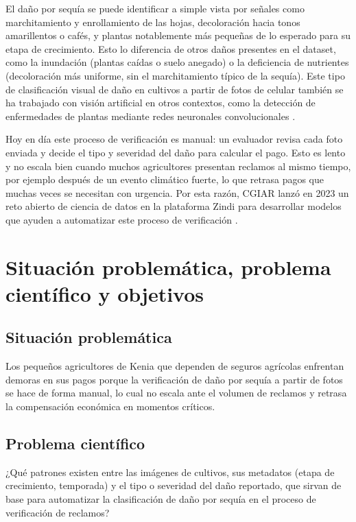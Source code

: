 \documentclass[11pt]{article}
\begin{document}
El daño por sequía se puede identificar a simple vista por señales como marchitamiento y enrollamiento de las hojas, decoloración hacia tonos amarillentos o cafés, y plantas notablemente más pequeñas de lo esperado para su etapa de crecimiento. Esto lo diferencia de otros daños presentes en el dataset, como la inundación (plantas caídas o suelo anegado) o la deficiencia de nutrientes (decoloración más uniforme, sin el marchitamiento típico de la sequía). Este tipo de clasificación visual de daño en cultivos a partir de fotos de celular también se ha trabajado con visión artificial en otros contextos, como la detección de enfermedades de plantas mediante redes neuronales convolucionales \cite{mohanty2016}.

Hoy en día este proceso de verificación es manual: un evaluador revisa cada foto enviada y decide el tipo y severidad del daño para calcular el pago. Esto es lento y no escala bien cuando muchos agricultores presentan reclamos al mismo tiempo, por ejemplo después de un evento climático fuerte, lo que retrasa pagos que muchas veces se necesitan con urgencia. Por esta razón, CGIAR lanzó en 2023 un reto abierto de ciencia de datos en la plataforma Zindi para desarrollar modelos que ayuden a automatizar este proceso de verificación \cite{zindi2023,sti2023}.

\section{Situación problemática, problema científico y objetivos}

\subsection*{Situación problemática}
Los pequeños agricultores de Kenia que dependen de seguros agrícolas enfrentan demoras en sus pagos porque la verificación de daño por sequía a partir de fotos se hace de forma manual, lo cual no escala ante el volumen de reclamos y retrasa la compensación económica en momentos críticos.

\subsection*{Problema científico}
¿Qué patrones existen entre las imágenes de cultivos, sus metadatos (etapa de crecimiento, temporada) y el tipo o severidad del daño reportado, que sirvan de base para automatizar la clasificación de daño por sequía en el proceso de verificación de reclamos?
\end{document}
